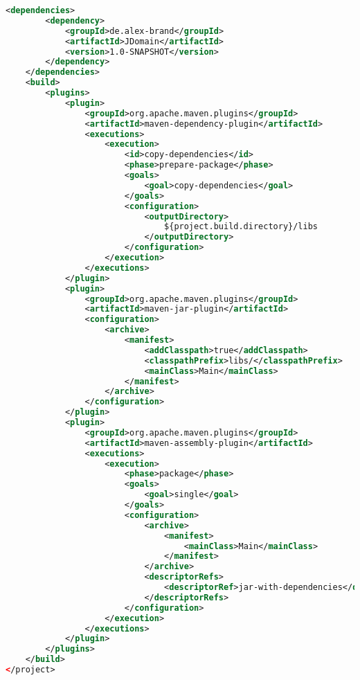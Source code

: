 \documentclass[./einleitung.tex]{subfiles}
\begin{document}
\begin{lstlisting}[language=xml, caption=pom.xml des JProjekt Artefakts, label=lst:pomJProjekt]
    <dependencies>
        <dependency>
            <groupId>de.alex-brand</groupId>
            <artifactId>JDomain</artifactId>
            <version>1.0-SNAPSHOT</version>
        </dependency>
    </dependencies>
    <build>
        <plugins>
            <plugin>
                <groupId>org.apache.maven.plugins</groupId>
                <artifactId>maven-dependency-plugin</artifactId>
                <executions>
                    <execution>
                        <id>copy-dependencies</id>
                        <phase>prepare-package</phase>
                        <goals>
                            <goal>copy-dependencies</goal>
                        </goals>
                        <configuration>
                            <outputDirectory>
                                ${project.build.directory}/libs
                            </outputDirectory>
                        </configuration>
                    </execution>
                </executions>
            </plugin>
            <plugin>
                <groupId>org.apache.maven.plugins</groupId>
                <artifactId>maven-jar-plugin</artifactId>
                <configuration>
                    <archive>
                        <manifest>
                            <addClasspath>true</addClasspath>
                            <classpathPrefix>libs/</classpathPrefix>
                            <mainClass>Main</mainClass>
                        </manifest>
                    </archive>
                </configuration>
            </plugin>
            <plugin>
                <groupId>org.apache.maven.plugins</groupId>
                <artifactId>maven-assembly-plugin</artifactId>
                <executions>
                    <execution>
                        <phase>package</phase>
                        <goals>
                            <goal>single</goal>
                        </goals>
                        <configuration>
                            <archive>
                                <manifest>
                                    <mainClass>Main</mainClass>
                                </manifest>
                            </archive>
                            <descriptorRefs>
                                <descriptorRef>jar-with-dependencies</descriptorRef>
                            </descriptorRefs>
                        </configuration>
                    </execution>
                </executions>
            </plugin>
        </plugins>
    </build>
</project>
    \end{lstlisting}
\end{document}
